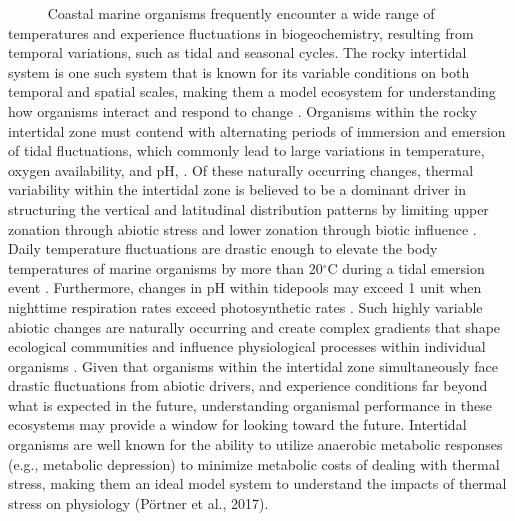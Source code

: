 \documentclass[
]{article}
\begin{document}
~~~~~ Coastal marine organisms frequently encounter a wide range of
temperatures and experience fluctuations in biogeochemistry, resulting
from temporal variations, such as tidal and seasonal cycles. The rocky
intertidal system is one such system that is known for its variable
conditions on both temporal and spatial scales, making them a model
ecosystem for understanding how organisms interact and respond to change
\citep{connell1961influence, paine1969pisaster, kwiatkowski2016nighttime, jellison2022low}.
Organisms within the rocky intertidal zone must contend with alternating
periods of immersion and emersion of tidal fluctuations, which commonly
lead to large variations in temperature, oxygen availability, and pH,
\citep{denny2001physical, helmuth2002climate}. Of these naturally
occurring changes, thermal variability within the intertidal zone is
believed to be a dominant driver in structuring the vertical and
latitudinal distribution patterns by limiting upper zonation through
abiotic stress and lower zonation through biotic influence
\citep{helmuth2006mosaic, somero2002thermal, somero2010physiology, connell1961influence}.
Daily temperature fluctuations are drastic enough to elevate the body
temperatures of marine organisms by more than 20\(^\circ\)C during a
tidal emersion event \citep{Helmuth1999thermal}. Furthermore, changes in
pH within tidepools may exceed 1 unit when nighttime respiration rates
exceed photosynthetic rates
\citep{jellison2016ocean, kwiatkowski2016nighttime}. Such highly
variable abiotic changes are naturally occurring and create complex
gradients that shape ecological communities and influence physiological
processes within individual organisms \citep{helmuth2006mosaic}. Given
that organisms within the intertidal zone simultaneously face drastic
fluctuations from abiotic drivers, and experience conditions far beyond
what is expected in the future, understanding organismal performance in
these ecosystems may provide a window for looking toward the future.
Intertidal organisms are well known for the ability to utilize anaerobic
metabolic responses (e.g., metabolic depression) to minimize metabolic
costs of dealing with thermal stress, making them an ideal model system
to understand the impacts of thermal stress on physiology (Pörtner et
al., 2017).
\end{document}
